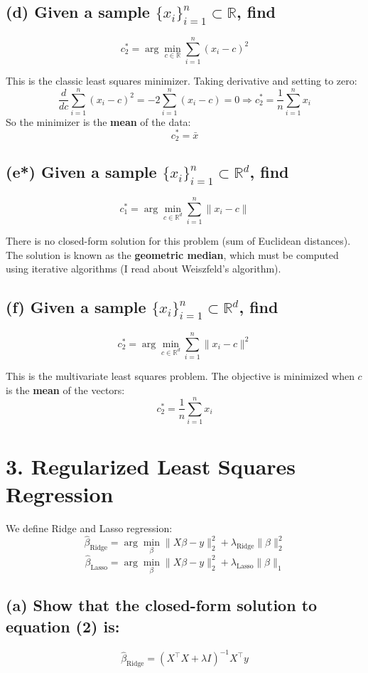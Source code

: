 \documentclass{article}
\begin{document}
\subsection*{(d) Given a sample \( \{x_i\}_{i=1}^n \subset \mathbb{R} \), find}
\[
c_2^* = \arg \min_{c \in \mathbb{R}} \sum_{i=1}^n (x_i - c)^2
\]

This is the classic least squares minimizer. Taking derivative and setting to zero:
\[
\frac{d}{dc} \sum_{i=1}^n (x_i - c)^2 = -2 \sum_{i=1}^n (x_i - c) = 0 \Rightarrow c_2^* = \frac{1}{n} \sum_{i=1}^n x_i
\]
So the minimizer is the \textbf{mean} of the data:
\[
c_2^* = \bar{x}
\]

\subsection*{(e*) Given a sample \( \{x_i\}_{i=1}^n \subset \mathbb{R}^d \), find}
\[
c_1^* = \arg \min_{c \in \mathbb{R}^d} \sum_{i=1}^n \|x_i - c\|
\]

There is no closed-form solution for this problem (sum of Euclidean distances). The solution is known as the \textbf{geometric median}, which must be computed using iterative algorithms (I read about Weiszfeld's algorithm).

\subsection*{(f) Given a sample \( \{x_i\}_{i=1}^n \subset \mathbb{R}^d \), find}
\[
c_2^* = \arg \min_{c \in \mathbb{R}^d} \sum_{i=1}^n \|x_i - c\|^2
\]

This is the multivariate least squares problem. The objective is minimized when \( c \) is the \textbf{mean} of the vectors:
\[
c_2^* = \frac{1}{n} \sum_{i=1}^n x_i
\]
\section*{3. Regularized Least Squares Regression}

We define Ridge and Lasso regression:
\[
\hat{\beta}_{\text{Ridge}} = \arg\min_\beta \|X\beta - y\|_2^2 + \lambda_{\text{Ridge}} \|\beta\|_2^2
\]
\[
\hat{\beta}_{\text{Lasso}} = \arg\min_\beta \|X\beta - y\|_2^2 + \lambda_{\text{Lasso}} \|\beta\|_1
\]

\subsection*{(a) Show that the closed-form solution to equation (2) is:}
\[
\hat{\beta}_{\text{Ridge}} = (X^\top X + \lambda I)^{-1} X^\top y
\]
\end{document}
